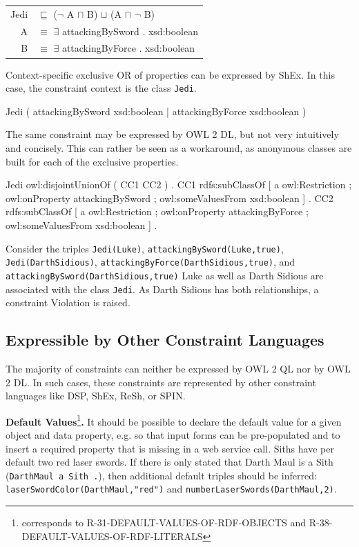 \documentclass{llncs}
\newcommand{\ms}[1]{\texttt{#1}}
\newenvironment{DL}{
  \begin{tabular}{r l}

}{
  \end{tabular}
  \linebreak
}
\begin{document}
\begin{center}
\begin{DL}
Jedi &$\sqsubseteq$ ($\neg$ A $\sqcap$ B) $\sqcup$ (A $\sqcap$ $\neg$ B) \\
A &$\equiv$ $\exists$ attackingBySword . xsd:boolean \\
B &$\equiv$ $\exists$ attackingByForce . xsd:boolean \\ 
\end{DL} 
\end{center}

Context-specific exclusive OR of properties can be expressed by ShEx. 
In this case, the constraint context is the class \ms{Jedi}.

\begin{ex}
Jedi { (  
    attackingBySword xsd:boolean | 
    attackingByForce xsd:boolean ) }
\end{ex}

The same constraint may be expressed by OWL 2 DL, but not very intuitively and concisely.
This can rather be seen as a workaround, as anonymous classes are built for each of the exclusive properties.

\begin{ex}
Jedi owl:disjointUnionOf ( CC1 CC2 ) . 
CC1 rdfs:subClassOf [
    a owl:Restriction ;
    owl:onProperty attackingBySword ;
    owl:someValuesFrom xsd:boolean ] .
CC2 rdfs:subClassOf [
    a owl:Restriction ;
    owl:onProperty attackingByForce ;
    owl:someValuesFrom xsd:boolean ] .
\end{ex}

Consider the triples \ms{Jedi(Luke)}, \ms{attackingBySword(Luke,true)}, \ms{Jedi(DarthSidious)},
\ms{attackingByForce(DarthSidious,true)}, and \ms{attackingBySword(DarthSidious,true)}
Luke as well as Darth Sidious are associated with the class \ms{Jedi}.
As Darth Sidious has both relationships, a constraint Violation is raised.

\subsection{Expressible by Other Constraint Languages}

The majority of constraints can neither be expressed by OWL 2 QL nor by OWL 2 DL. 
In such cases, these constraints are represented by other constraint languages like DSP, ShEx, ReSh, or SPIN.

\textbf{Default Values}\footnote{corresponds to R-31-DEFAULT-VALUES-OF-RDF-OBJECTS and R-38-DEFAULT-VALUES-OF-RDF-LITERALS}\textbf{.}
It should be possible to declare the default value for a given object and data property, e.g. so that input forms can be pre-populated and to insert a required property that is missing in a web service call. 
Siths have per default two red laser swords.
If there is only stated that Darth Maul is a Sith (\ms{DarthMaul a Sith .}), then additional default triples should be inferred: 
\ms{laserSwordColor(DarthMaul,"red")} and \ms{numberLaserSwords(DarthMaul,2)}.
\end{document}
